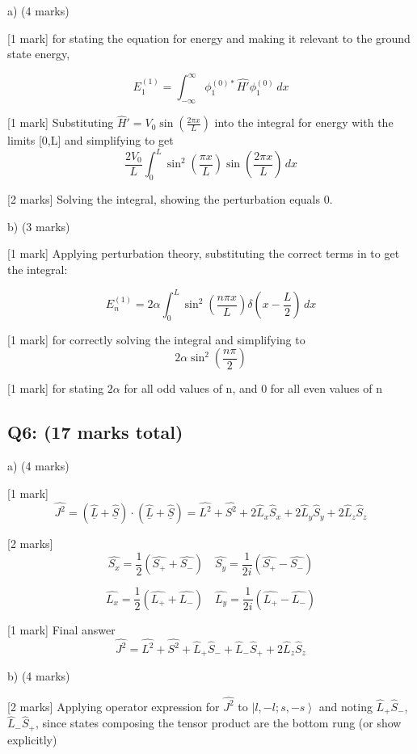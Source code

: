\documentclass[a4paper,11pt]{article}
\begin{document}
a) (4 marks)

[1 mark] for stating the equation for energy and making it relevant to the ground state energy, 

\[ E_{1}^{(1)} = \int_{-\infty}^{\infty} \phi_{1}^{(0)*}\hat{H'}\phi_{1}^{(0)} \, dx \]

[1 mark] Substituting \( \hat{H}' = V_{0} \sin\left(\frac{2 \pi x}{L} \right) \) into the integral for energy with the limits [0,L] and simplifying to get \[ \frac{2V_{0}}{L} \int_{0}^{L} \sin^{2}\left(\frac{ \pi x}{L} \right)\sin\left(\frac{ 2\pi x}{L} \right) \, dx \]

[2 marks] Solving the integral, showing the perturbation equals 0.

b) (3 marks)

[1 mark] Applying perturbation theory, substituting the correct terms in to get the integral: 

\[ E_{n}^{(1)} = 2 \alpha \int_{0}^{L} \sin^{2}\left(\frac{n \pi x}{L} \right) \delta\left(x - \frac{L}{2} \right) \, dx \]

[1 mark] for correctly solving the integral and simplifying to 
\[ 2 \alpha \sin^{2}\left(\frac{n \pi}{2} \right) \]

[1 mark] for stating \(2 \alpha \) for all odd values of n, and 0 for all even values of n 

\subsection*{Q6: (17 marks total) }

a) (4 marks)

[1 mark] \[ \hat{J^{2}} = \left(\hat{\underline{L}} + \hat{\underline{S}} \right) \cdot \left(\hat{\underline{L}} + \hat{\underline{S}} \right) =  \hat{L^{2}} + \hat{S^{2}} + 2\hat{L}_{x}\hat{S}_{x} + 2\hat{L}_{y}\hat{S}_{y} + 2\hat{L}_{z}\hat{S}_{z} \]

[2 marks]  \[ \hat{S_{x}} = \frac{1}{2} (\hat{S_{+}} + \hat{S_{-}}) \quad \hat{S_{y}} = \frac{1}{2i} (\hat{S_{+}} - \hat{S_{-}}) \] 

\[ \hat{L_{x}} = \frac{1}{2} (\hat{L_{+}} + \hat{L_{-}}) \quad \hat{L_{y}} = \frac{1}{2i} (\hat{L_{+}} - \hat{L_{-}}) \]

[1 mark] Final answer \[ \hat{J^{2}} =  \hat{L^{2}} + \hat{S^{2}} + \hat{L}_{+}\hat{S}_{-} +  \hat{L}_{-}\hat{S}_{+} + 2\hat{L}_{z}\hat{S}_{z} \]

b) (4 marks)

[2 marks] Applying operator expression for \( \hat{J^{2}} \) to \( \left|l, -l; s, -s \right> \) and noting \( \hat{L}_{+}\hat{S}_{-} \), \( \hat{L}_{-}\hat{S}_{+} \), since states composing the tensor product are the bottom rung (or show explicitly)
\end{document}

